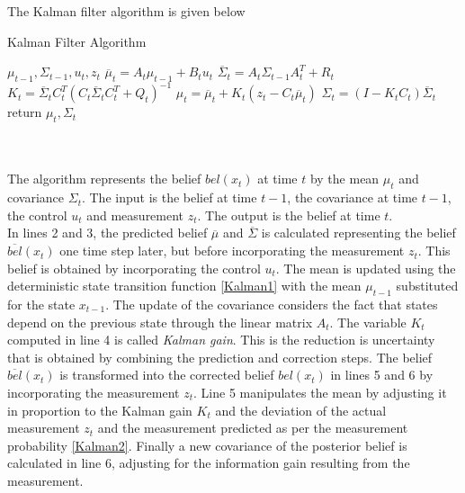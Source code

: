 \documentclass[conference]{IEEEtran}
\begin{document}
The Kalman filter algorithm is given below \cite{thrun}

\begin{minipage}{\linewidth}
  \begin{algorithm}[H]
    \caption{Kalman Filter Algorithm}\label{AlgKalman}
    \begin{algorithmic}[1]
       {$\mu_{t-1},\Sigma_{t-1}, u_t,z_t$}
	\State $\overline \mu_t = A_t \mu_{t-1} + B_t u_t$
	\State $\overline \Sigma_t= A_t \Sigma_{t-1} A_t^T + R_t$  
	\State $K_t = \overline \Sigma_t C_t^T{(C_t \overline \Sigma_t C_t^T + Q_t)}^{-1}$
	\State $\mu_t = \overline \mu_t + K_t(z_t - C_t \overline \mu_t)$
	\State $\Sigma_t = (I - K_t C_t) \overline \Sigma_t$
	\State return $\mu_t, \Sigma_t$
      \EndProcedure
    \end{algorithmic}
  \end{algorithm}
\end{minipage}\\\\

The algorithm represents the belief $bel(x_t)$ at time $t$ by the mean $\mu_t$ and covariance $\Sigma_t$. The input is the belief at time $t-1$, the covariance at time $t-1$, the control $u_t$ and measurement $z_t$. The output is the belief at time $t$.\\

In lines 2 and 3, the predicted belief $\overline \mu$ and $\overline \Sigma$ is calculated representing the belief $\overline{bel}(x_t)$ one time step later, but before incorporating the measurement $z_t$. This belief is obtained by incorporating the control $u_t$. The mean is updated using the deterministic state transition function \ref{Kalman1} with the mean $\mu_{t-1}$ substituted for the state $x_{t-1}$. The update of the covariance considers the fact that states depend on the previous state through the linear matrix $A_t$. The variable $K_t$ computed in line 4 is called \textit{Kalman gain}. This is the reduction is uncertainty that is obtained by combining the prediction and correction steps. The belief $\overline{bel}(x_t)$ is transformed into the corrected belief ${bel}(x_t)$ in lines 5 and 6 by incorporating the measurement $z_t$. Line 5 manipulates the mean by adjusting it in proportion to the Kalman gain $K_t$ and the deviation of the actual measurement $z_t$ and the measurement predicted as per the measurement probability \ref{Kalman2}. Finally a new covariance of the posterior belief is calculated in line 6, adjusting for the information gain resulting from the measurement.\\
\end{document}
